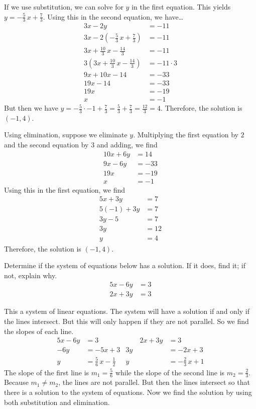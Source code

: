 \documentclass[11pt,letterpaper]{article}
\begin{document}
If we use substitution, we can solve for $y$ in the first equation. This yields $y= -\frac{5}{3}\,x + \frac{7}{3}$. Using this in the second equation, we have\dots
	\[
	\begin{aligned}
	3x - 2y&= -11 \\
	3x - 2 \left( -\frac{5}{3}\,x + \frac{7}{3} \right)&= -11 \\
	3x + \frac{10}{3}\, x - \frac{14}{3}&= -11 \\
	3 \left( 3x + \frac{10}{3}\, x - \frac{14}{3} \right)&= -11 \cdot 3 \\
	9x + 10x - 14&= -33 \\
	19x - 14&= -33 \\
	19x&= -19 \\
	x&= -1
	\end{aligned}
	\]
But then we have $y= -\frac{5}{3} \cdot -1 + \frac{7}{3}= \frac{5}{3} + \frac{7}{3}= \frac{12}{3}= 4$. Therefore, the solution is $(-1, 4)$. \pspace

Using elimination, suppose we eliminate $y$. Multiplying the first equation by $2$ and the second equation by $3$ and adding, we find
	\[
	\begin{aligned}
	10x + 6y&= 14 \\
	9x - 6y&= -33 \\ \hline
	19x&= -19 \\
	x&= -1
	\end{aligned}
	\] 
Using this in the first equation, we find
	\[
	\begin{aligned}
	5x + 3y&= 7 \\
	5(-1) + 3y&= 7 \\
	3y - 5&= 7 \\
	3y&= 12 \\
	y&= 4
	\end{aligned}
	\]
Therefore, the solution is $(-1, 4)$. 





\newpage





 Determine if the system of equations below has a solution. If it does, find it; if not, explain why. 
	\[
	\begin{aligned}
	5x - 6y&= 3 \\
	2x + 3y&= 3
	\end{aligned}
	\] 

\sol This a system of linear equations. The system will have a solution if and only if the lines intersect. But this will only happen if they are not parallel. So we find the slopes of each line.
	\[
	\begin{aligned}
	5x - 6y&= 3 &\quad\quad 2x + 3y&= 3 \\
	-6y&= -5x + 3 & 3y&= -2x + 3 \\
	y&= \frac{5}{6}\,x - \frac{1}{2} & y&= -\frac{2}{3}\,x + 1
	\end{aligned}
	\]
The slope of the first line is $m_1= \frac{5}{6}$ while the slope of the second line is $m_2= \frac{2}{3}$. Because $m_1 \neq m_2$, the lines are not parallel. But then the lines intersect so that there is a solution to the system of equations. Now we find the solution by using both substitution and elimination. 
\end{document}
